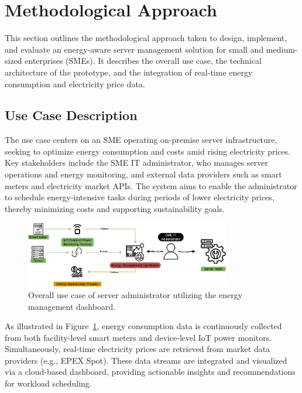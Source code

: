 

\section{Methodological Approach}
\label{methodology:methodological-approach}
This section outlines the methodological approach taken to design, implement, and evaluate an energy-aware server management solution for small and medium-sized enterprises (SMEs).
It describes the overall use case, the technical architecture of the prototype, and the integration of real-time energy consumption and electricity price data.

\subsection{Use Case Description}
\label{methodology:use-case-description}
The use case centers on an SME operating on-premise server infrastructure, seeking to optimize energy consumption and costs amid rising electricity prices. Key stakeholders include the SME IT administrator, who manages server operations and energy monitoring, and external data providers such as smart meters and electricity market APIs. The system aims to enable the administrator to schedule energy-intensive tasks during periods of lower electricity prices, thereby minimizing costs and supporting sustainability goals.
\begin{figure}[h!]
\centering
\includegraphics[width=0.8\textwidth]{fig/high_level_use_case.png}
\caption{Overall use case of server administrator utilizing the energy management dashboard.}
\label{fig:highleveluse}
\end{figure}
As illustrated in Figure~\ref{fig:highleveluse}, energy consumption data is continuously collected from both facility-level smart meters and device-level IoT power monitors. Simultaneously, real-time electricity prices are retrieved from market data providers (e.g., EPEX Spot). These data streams are integrated and visualized via a cloud-based dashboard, providing actionable insights and recommendations for workload scheduling.
\newpage
